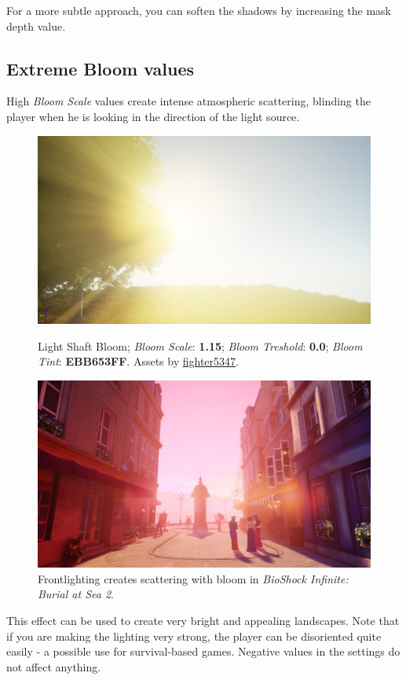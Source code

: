\documentclass[A4]{article}
\begin{document}
	For a more subtle approach, you can soften the shadows by increasing the mask depth value.

	\clearpage

	\subsection*{Extreme Bloom values}
	High \textit{Bloom Scale} values create intense atmospheric scattering, blinding the player when he is looking in the direction of the light source.
	\begin{figure}
		\vspace{-20px}
		\begin{center}
			\includegraphics[scale=0.13]{BloomExtreme.png}
		\end{center}
		\vspace{-20px}
		\caption{Light Shaft Bloom; \textit{Bloom Scale}: \textbf{1.15}; \textit{Bloom Treshold}: \textbf{0.0}; \textit{Bloom Tint}: \textbf{EBB653FF}. Assets by \href{https://forums.unrealengine.com/showthread.php?59812-FREE-Foliage-Starter-Kit}{fighter5347}.}
		\begin{center}
			\includegraphics[scale=0.07]{Bioshock.jpg}
		\end{center}
		\vspace{-20px}
		\caption{Frontlighting creates scattering with bloom in \textit{BioShock Infinite: Burial at Sea 2}.}
	\end{figure}
	This effect can be used to create very bright and appealing landscapes. Note that if you are making the lighting very strong, the player can be disoriented quite easily - a possible use for survival-based games. Negative values in the settings do not affect anything.
	
\end{document}
